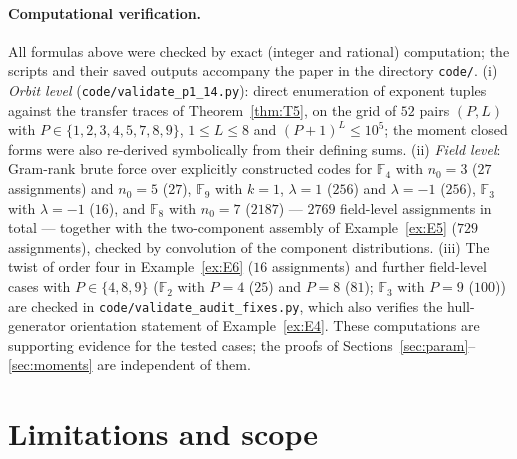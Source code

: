 \documentclass[11pt]{article}
\theoremstyle{definition}
\theoremstyle{remark}
\begin{document}
\paragraph{Computational verification.}
All formulas above were checked by exact (integer and rational)
computation; the scripts and their saved outputs accompany the paper in
the directory \texttt{code/}. (i) \emph{Orbit level}
(\texttt{code/validate\_p1\_14.py}): direct enumeration of exponent
tuples against the transfer traces of Theorem~\ref{thm:T5}, on the grid
of \(52\) pairs \((P,L)\) with \(P \in \{1,2,3,4,5,7,8,9\}\),
\(1 \le L \le 8\) and \((P+1)^L \le 10^5\); the moment closed forms were
also re-derived symbolically from their defining sums. (ii) \emph{Field
level}: Gram-rank brute force over explicitly constructed codes for
\(\mathbb{F}_4\) with \(n_0 = 3\) (\(27\) assignments) and \(n_0 = 5\)
(\(27\)), \(\mathbb{F}_9\) with \(k = 1\), \(\lambda = 1\) (\(256\)) and
\(\lambda = -1\) (\(256\)), \(\mathbb{F}_3\) with \(\lambda = -1\)
(\(16\)), and \(\mathbb{F}_8\) with \(n_0 = 7\) (\(2187\)) ---
\(2769\) field-level assignments in total --- together with the
two-component assembly of Example~\ref{ex:E5} (\(729\) assignments),
checked by convolution of the component distributions. (iii) The twist
of order four in Example~\ref{ex:E6} (\(16\) assignments) and further
field-level cases with \(P \in \{4, 8, 9\}\) (\(\mathbb{F}_2\) with
\(P = 4\) (\(25\)) and \(P = 8\) (\(81\)); \(\mathbb{F}_3\) with
\(P = 9\) (\(100\))) are checked in
\texttt{code/validate\_audit\_fixes.py}, which also verifies the
hull-generator orientation statement of Example~\ref{ex:E4}. These computations are supporting evidence for the
tested cases; the proofs of
Sections~\ref{sec:param}--\ref{sec:moments} are independent of them.

\section{Limitations and scope}\label{sec:limitations}
\end{document}
